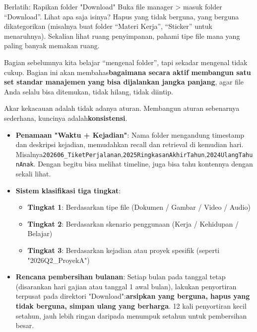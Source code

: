 \begin{tcbpractice}{Berlatih: Rapikan folder "Download"}
Buka file manager > masuk folder “Download”. Lihat apa saja isinya? Hapus yang tidak berguna, yang berguna dikategorikan (misalnya buat folder “Materi Kerja”, “Sticker” untuk menaruhnya). Sekalian lihat ruang penyimpanan, pahami tipe file mana yang paling banyak memakan ruang.

\end{tcbpractice}


Bagian sebelumnya kita belajar “mengenal folder”, tapi sekadar mengenal tidak cukup. Bagian ini akan membahas\textbf{bagaimana secara aktif membangun satu set standar manajemen yang bisa dijalankan jangka panjang}, agar file Anda selalu bisa ditemukan, tidak hilang, tidak diintip.


Akar kekacauan adalah tidak adanya aturan. Membangun aturan sebenarnya sederhana, kuncinya adalah\textbf{konsistensi}.

\begin{itemize}
  \item \textbf{Penamaan "Waktu + Kejadian"}: Nama folder mengandung timestamp dan deskripsi kejadian, memudahkan recall dan retrieval di kemudian hari. Misalnya\texttt{202606\_TiketPerjalanan},\texttt{2025RingkasanAkhirTahun},\texttt{2024UlangTahunAnak}. Dengan begitu bisa melihat timeline, juga bisa tahu kontennya dengan sekali lihat.
  \item \textbf{Sistem klasifikasi tiga tingkat}:
  \begin{itemize}
    \item \textbf{Tingkat 1}: Berdasarkan tipe file (Dokumen / Gambar / Video / Audio)
    \item \textbf{Tingkat 2}: Berdasarkan skenario penggunaan (Kerja / Kehidupan / Belajar)
    \item \textbf{Tingkat 3}: Berdasarkan kejadian atau proyek spesifik (seperti "2026Q2\_ProyekA")
  \end{itemize}
  \item \textbf{Rencana pembersihan bulanan}: Setiap bulan pada tanggal tetap (disarankan hari gajian atau tanggal 1 awal bulan), lakukan penyortiran terpusat pada direktori "Download":\textbf{arsipkan yang berguna, hapus yang tidak berguna, simpan ulang yang berharga}. 12 kali penyortiran kecil setahun, jauh lebih ringan daripada menumpuk setahun untuk pembersihan besar.
\end{itemize}

